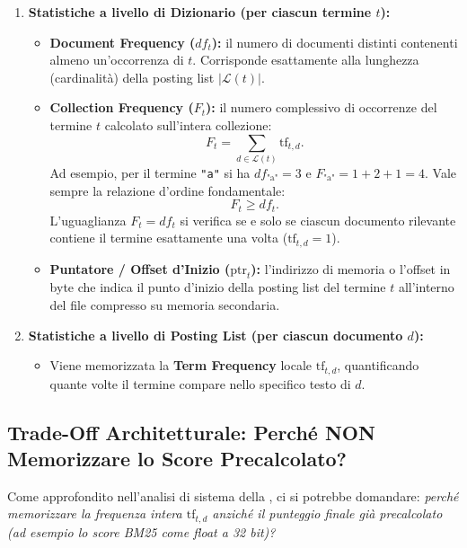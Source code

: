 \begin{enumerate}
    \item \textbf{Statistiche a livello di Dizionario (per ciascun termine $t$):}
    \begin{itemize}
        \item \textbf{Document Frequency ($df_t$):} il numero di documenti distinti contenenti almeno un'occorrenza di $t$. Corrisponde esattamente alla lunghezza (cardinalit\`a) della posting list $|\mathcal{L}(t)|$.
        \item \textbf{Collection Frequency ($F_t$):} il numero complessivo di occorrenze del termine $t$ calcolato sull'intera collezione:
        \begin{equation}
        F_t = \sum_{d \in \mathcal{L}(t)} \text{tf}_{t,d}.
        \end{equation}
        Ad esempio, per il termine \texttt{"a"} si ha $df_{\text{"a"}} = 3$ e $F_{\text{"a"}} = 1 + 2 + 1 = 4$. Vale sempre la relazione d'ordine fondamentale:
        \begin{equation}
        F_t \ge df_t.
        \end{equation}
        L'uguaglianza $F_t = df_t$ si verifica se e solo se ciascun documento rilevante contiene il termine esattamente una volta ($\text{tf}_{t,d} = 1$).
        \item \textbf{Puntatore / Offset d'Inizio ($\text{ptr}_t$):} l'indirizzo di memoria o l'offset in byte che indica il punto d'inizio della posting list del termine $t$ all'interno del file compresso su memoria secondaria.
    \end{itemize}
    \item \textbf{Statistiche a livello di Posting List (per ciascun documento $d$):}
    \begin{itemize}
        \item Viene memorizzata la \textbf{Term Frequency} locale $\text{tf}_{t,d}$, quantificando quante volte il termine compare nello specifico testo di $d$.
    \end{itemize}
\end{enumerate}

\FloatBarrier
\subsection{Trade-Off Architetturale: Perch\'e NON Memorizzare lo Score Precalcolato?}
Come approfondito nell'analisi di sistema della , ci si potrebbe domandare: \textit{perch\'e memorizzare la frequenza intera $\text{tf}_{t,d}$ anzich\'e il punteggio finale gi\`a precalcolato (ad esempio lo score BM25 come float a 32 bit)?}

